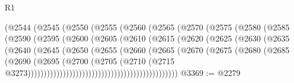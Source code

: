 \begin{lexlean}{R1}
\begin{coremodule}
                          (@2544
                            (@2545
                              (@2550
                                (@2555
                                  (@2560
                                    (@2565
                                      (@2570
                                        (@2575
                                          (@2580
                                            (@2585
                                              (@2590
                                                (@2595
                                                  (@2600
                                                    (@2605
                                                      (@2610
                                                        (@2615
                                                          (@2620
                                                            (@2625
                                                              (@2630
                                                                (@2635
                                                                  (@2640
                                                                    (@2645
                                                                      (@2650
                                                                        (@2655
                                                                          (@2660
                                                                            (@2665
                                                                              (@2670
                                                                                (@2675
                                                                                  (@2680
                                                                                    (@2685
                                                                                      (@2690
                                                                                        (@2695
                                                                                          (@2700
                                                                                            (@2705
                                                                                              (@2710
                                                                                                (@2715
                                                                                                  @3273)))))))))))))))))))))))))))))))))))))))))))))))
@3369 := @2279

\end{coremodule}
\end{lexlean}
